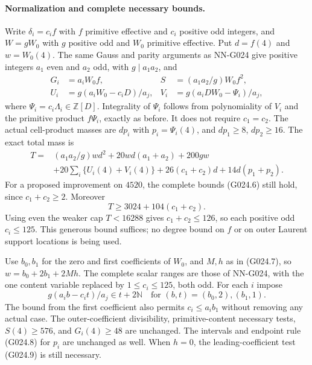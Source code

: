 \paragraph{Normalization and complete necessary bounds.}
Write $\delta_i=c_i f$ with $f$ primitive effective and
$c_i$ positive odd integers, and $W=gW_0$ with $g$
positive odd and $W_0$ primitive effective. Put
$d=f(4)$ and $w=W_0(4)$. The same Gauss and parity
arguments as NN-G024 give positive integers $a_1$ even
and $a_2$ odd, with $g\mid a_1a_2$, and
\[
 \begin{aligned}
 G_i&=a_iW_0f,&S&=(a_1a_2/g)W_0f^2,\\
 U_i&=g(a_iW_0-c_iD)/a_j,&
 V_i&=g(a_iDW_0-\Psi_i)/a_j,
 \end{aligned}                                                      \tag{G025.4}
\]
where $\Psi_i=c_i\Lambda_i\in\mathbb Z[D]$.
Integrality of $\Psi_i$ follows from polynomiality of
$V_i$ and the primitive product $f\Psi_i$, exactly
as before. It does not require $c_1=c_2$.
The actual cell-product masses are $dp_i$ with
$p_i=\Psi_i(4)$, and $dp_1\ge8$, $dp_2\ge16$.
The exact total mass is
\[
 \begin{split}
 T={}&(a_1a_2/g)wd^2+20wd(a_1+a_2)+200gw\\
 &+20\sum_i\{U_i(4)+V_i(4)\}
       +26(c_1+c_2)d+14d(p_1+p_2).
 \end{split}                                                        \tag{G025.5}
\]
For a proposed improvement on $4520$, the complete
bounds (G024.6) still hold, since $c_1+c_2\ge2$.
Moreover
\[
 T\ge3024+104(c_1+c_2).
\]
Using even the weaker cap $T<16288$ gives
$c_1+c_2\le126$, so each positive odd $c_i\le125$.
This generous bound suffices; no degree bound on $f$
or on outer Laurent support locations is being used.

Use $b_0,b_1$ for the zero and first coefficients of
$W_0$, and $M,h$ as in (G024.7), so
$w=b_0+2b_1+2Mh$.
The complete scalar ranges are those of NN-G024,
with the one content variable replaced by
$1\le c_i\le125$, both odd. For each $i$ impose
\[
 g(a_i b-c_i t)/a_j\in t+2\mathbb N
 \quad\text{for }(b,t)=(b_0,2),(b_1,1).               \tag{G025.6}
\]
The bound from the first coefficient also permits
$c_i\le a_i b_1$ without removing any actual case.
The outer-coefficient divisibility, primitive-content
necessary tests, $S(4)\ge576$, and $G_i(4)\ge48$ are
unchanged. The intervals and endpoint rule (G024.8)
for $p_i$ are unchanged as well. When $h=0$, the
leading-coefficient test (G024.9) is still necessary.

